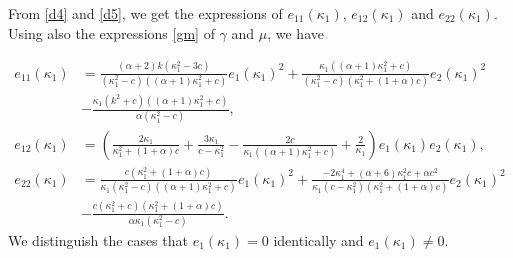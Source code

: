 \documentclass{birkjour}
\theoremstyle{definition}
\theoremstyle{remark}
\numberwithin{equation}{section}
\begin{document}
From \eqref{d4} and \eqref{d5}, we get the expressions of $e_{11}(\kappa_1)$, $e_{12}(\kappa_1)$ and $e_{22}(\kappa_1)$. Using also the expressions \eqref{gm} of $\gamma$ and $\mu$, we have

\begin{equation}\label{d7}
\begin{split}
e_{11}(\kappa_1)&=\frac{(\alpha +2) k \left(\kappa_1^2-3 c\right)}{\left(\kappa_1^2-c\right) \left((\alpha +1) \kappa_1^2+c\right)}e_1(\kappa_1)^2+\frac{\kappa_1 \left((\alpha +1) \kappa_1^2+c\right)}{\left(\kappa_1^2-c\right) \left(\kappa_1^2+(1+\alpha)c\right)}e_2(\kappa_1)^2\\
&-\frac{\kappa_1 \left(k^2+c\right) \left((\alpha +1) \kappa_1^2+c\right)}{\alpha  \left(\kappa_1^2-c\right)},\\
e_{12}(\kappa_1)&=  \left(  \frac{2\kappa_1}{\kappa_1^2+(1+\alpha)c}+\frac{3\kappa_1}{c-\kappa_1^2} -\frac{2 c}{\kappa_1((\alpha +1) \kappa_1^2+c)}+\frac{2}{\kappa_1}\right) e_1(\kappa_1)e_2(\kappa_1),\\
e_{22}(\kappa_1)&=\frac{c \left(\kappa_1^2+(1+\alpha)c\right)}{\kappa_1 \left(\kappa_1^2-c\right) \left((\alpha +1) \kappa_1^2+c\right)}e_1(\kappa_1)^2+\frac{-2 \kappa_1^4+(\alpha +6) \kappa_1^2 c+\alpha  c^2}{\kappa_1 \left(c-\kappa_1^2\right) \left(\kappa_1^2+(1+\alpha)c\right)}e_2(\kappa_1)^2\\
&-\frac{c \left(\kappa_1^2+c\right) \left(\kappa_1^2+(1+\alpha)c\right)}{\alpha  \kappa_1 \left(\kappa_1^2-c\right)}.
\end{split}
\end{equation}
We distinguish the cases that $e_1(\kappa_1)=0$ identically and $e_1(\kappa_1)\not=0$.
\end{document}
